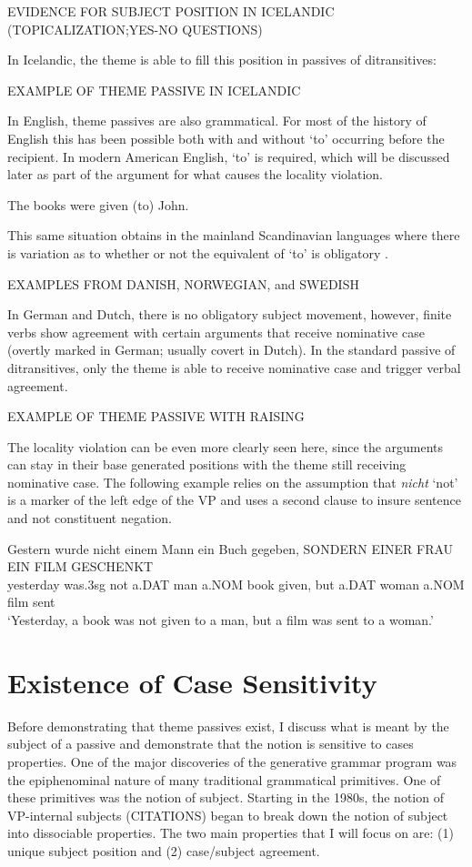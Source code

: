 EVIDENCE FOR SUBJECT POSITION IN ICELANDIC (TOPICALIZATION;YES-NO QUESTIONS)
\bigskip

In Icelandic, the theme is able to fill this position in passives of ditransitives:
\bigskip

EXAMPLE OF THEME PASSIVE IN ICELANDIC
\bigskip

In English, theme passives are also grammatical. For most of the history of English this has been possible both with and without `to' occurring before the recipient. In modern American English, `to' is required, which will be discussed later as part of the argument for what causes the locality violation.

\begin{exe}
\ex The books were given (to) John.
\end{exe}

This same situation obtains in the mainland Scandinavian languages where there is variation as to whether or not the equivalent of `to' is obligatory \citep{Falk.1990,Sprouse.1995}.
\bigskip

EXAMPLES FROM DANISH, NORWEGIAN, and SWEDISH
\bigskip

In German and Dutch, there is no obligatory subject movement, however, finite verbs show agreement with certain arguments that receive nominative case (overtly marked in German; usually covert in Dutch). In the standard passive of ditransitives, only the theme is able to receive nominative case and trigger verbal agreement.
\bigskip

EXAMPLE OF THEME PASSIVE WITH RAISING
\bigskip

The locality violation can be even more clearly seen here, since the arguments can stay in their base generated positions with the theme still receiving nominative case. The following example relies on the assumption that \textit{nicht} `not' is a marker of the left edge of the VP and uses a second clause to insure sentence and not constituent negation.

\begin{exe}
\ex \gll Gestern wurde nicht einem Mann ein Buch gegeben, SONDERN EINER FRAU EIN FILM GESCHENKT \\
yesterday was.3sg not a.DAT man a.NOM book given, but a.DAT woman a.NOM film sent\\
\trans `Yesterday, a book was not given to a man, but a film was sent to a woman.'
\end{exe}


\section{Existence of Case Sensitivity}
Before demonstrating that theme passives exist, I discuss what is meant by the subject of a passive and demonstrate that the notion is sensitive to cases properties. One of the major discoveries of the generative grammar program was the epiphenominal nature of many traditional grammatical primitives. One of these primitives was the notion of subject. Starting in the 1980s, the notion of VP-internal subjects (CITATIONS) began to break down the notion of subject into dissociable properties. The two main properties that I will focus on are: (1) unique subject position and (2) case/subject agreement. 

